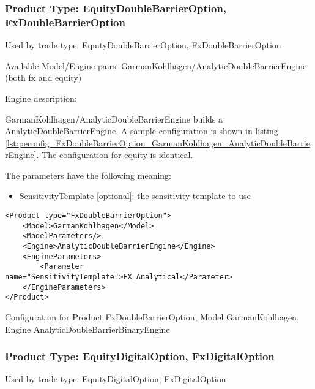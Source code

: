 \subsubsection{Product Type: EquityDoubleBarrierOption, FxDoubleBarrierOption}

Used by trade type: EquityDoubleBarrierOption, FxDoubleBarrierOption

Available Model/Engine pairs: GarmanKohlhagen/AnalyticDoubleBarrierEngine (both fx and equity)

Engine description:

GarmanKohlhagen/AnalyticDoubleBarrierEngine builds a AnalyticDoubleBarrierEngine. A sample configuration is shown in
listing \ref{lst:peconfig_FxDoubleBarrierOption_GarmanKohlhagen_AnalyticDoubleBarrierEngine}. The configuration for equity
is identical.

The parameters have the following meaning:

\begin{itemize}
\item SensitivityTemplate [optional]: the sensitivity template to use 
\end{itemize}

\begin{longlisting}
\begin{verbatim}
<Product type="FxDoubleBarrierOption">
    <Model>GarmanKohlhagen</Model>
    <ModelParameters/>
    <Engine>AnalyticDoubleBarrierEngine</Engine>
    <EngineParameters>
        <Parameter name="SensitivityTemplate">FX_Analytical</Parameter>
    </EngineParameters>
</Product>
\end{verbatim}
\caption{Configuration for Product FxDoubleBarrierOption, Model GarmanKohlhagen, Engine AnalyticDoubleBarrierBinaryEngine}
\label{lst:peconfig_FxDoubleBarrierOption_GarmanKohlhagen_AnalyticDoubleBarrierEngine}
\end{longlisting}


\subsubsection{Product Type: EquityDigitalOption, FxDigitalOption}

Used by trade type: EquityDigitalOption, FxDigitalOption

